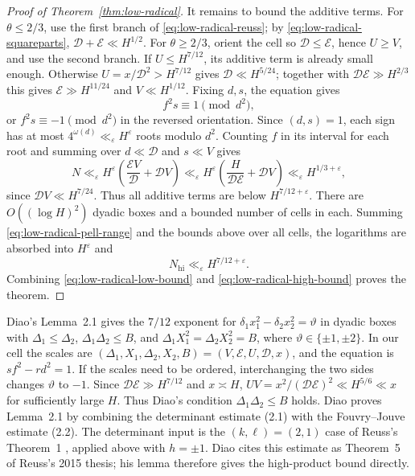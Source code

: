\begin{proof}[Proof of Theorem~\ref{thm:low-radical}]
It remains to bound the additive terms. For $\theta\le2/3$, use the first
branch of \eqref{eq:low-radical-reuss}; by
\eqref{eq:low-radical-squareparts}, $\mathcal D+\mathcal E\ll H^{1/2}$. For $\theta\ge2/3$,
orient the cell so $\mathcal D\le \mathcal E$, hence $U\ge V$, and use the second branch.
If $U\le H^{7/12}$, its additive term is already small enough. Otherwise
$U=x/\mathcal D^2>H^{7/12}$ gives $\mathcal D\ll H^{5/24}$; together with
$\mathcal D\mathcal E\gg H^{2/3}$ this gives $\mathcal E\gg H^{11/24}$ and $V\ll H^{1/12}$.
Fixing $d,s$, the equation gives
\[
f^2s\equiv1\pmod{d^2},
\]
or $f^2s\equiv-1\pmod{d^2}$ in the reversed orientation. Since
$(d,s)=1$, each sign has at most $4^{\omega(d)}\ll_\varepsilon H^\varepsilon$
roots modulo $d^2$. Counting $f$ in its interval for each root and
summing over $d\ll \mathcal D$ and $s\ll V$ gives
\[
N\ll_\varepsilon H^\varepsilon
       \left(\frac{\mathcal E V}{\mathcal D}+\mathcal D V\right)
 \ll_\varepsilon H^\varepsilon
       \left(\frac{H}{\mathcal D\mathcal E}+\mathcal D V\right)
 \ll_\varepsilon H^{1/3+\varepsilon},
\]
since $\mathcal D V\ll H^{7/24}$. Thus all additive terms are below
$H^{7/12+\varepsilon}$. There are $O((\log H)^2)$ dyadic boxes and a
bounded number of cells in each. Summing
\eqref{eq:low-radical-pell-range} and the bounds above over all cells, the
logarithms are absorbed into $H^\varepsilon$ and
\begin{equation}\label{eq:low-radical-high-bound}
N_{\mathrm{hi}}\ll_\varepsilon H^{7/12+\varepsilon}.
\end{equation}
Combining \eqref{eq:low-radical-low-bound} and
\eqref{eq:low-radical-high-bound} proves the theorem.
\end{proof}

\begin{remark}
Diao's Lemma~2.1 \cite{Diao2026} gives the $7/12$ exponent for
$\delta_1x_1^2-\delta_2x_2^2=\vartheta$ in dyadic boxes with
$\Delta_1\le\Delta_2$, $\Delta_1\Delta_2\le B$, and
$\Delta_1X_1^2=\Delta_2X_2^2=B$, where $\vartheta\in\{\pm1,\pm2\}$. In our
cell the scales are $(\Delta_1,X_1,\Delta_2,X_2,B)
=(V,\mathcal E,U,\mathcal D,x)$, and the equation is
$sf^2-rd^2=1$. If the scales need to be ordered, interchanging the two
sides changes $\vartheta$ to $-1$. Since $\mathcal D\mathcal E\gg H^{7/12}$ and $x\asymp H$,
$UV=x^2/(\mathcal D\mathcal E)^2\ll H^{5/6}\ll x$ for sufficiently large $H$.
Thus Diao's condition $\Delta_1\Delta_2\le B$ holds. Diao proves Lemma~2.1 by
combining the determinant estimate (2.1) with the Fouvry--Jouve estimate
(2.2). The determinant input is the $(k,\ell)=(2,1)$ case of Reuss's
Theorem~1 \cite{Reuss2014}, applied above with $h=\pm1$. Diao cites this
estimate as Theorem~5 of Reuss's 2015 thesis; his lemma therefore gives the
high-product bound directly.
\end{remark}
